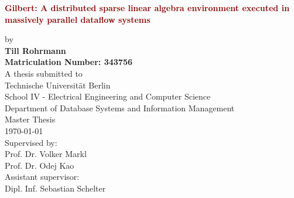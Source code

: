 \begin{titlepage}
	\strut
	\hfill
	\begin{center}
	\vspace{1cm}
	\Huge
	\begin{spacing}{.9}
		\textcolor{DarkRed}{\textbf{Gilbert: A distributed sparse linear algebra environment executed in massively parallel dataflow systems}}\\
	\end{spacing}
	\vspace{0.8cm}
	\large
	by\\
	\vspace{0.8cm} 
	\textbf{Till Rohrmann}\\
	\vspace{0.8cm} 
	\textbf{Matriculation Number: 343756}\\
	\vspace{2cm} 
 	A thesis submitted to\\
	\vspace{0.5cm}
	Technische Universität Berlin\\
	School IV - Electrical Engineering and Computer Science\\
	Department of Database Systems and Information Management\\
	\vspace{0.5cm}
	Master Thesis\\
	\vspace{2.2cm}
	\today\\
	\vspace{2.0cm}
	\large
	Supervised by:\\
	Prof. Dr. Volker Markl\\
	Prof. Dr. Odej Kao\\
	\vspace{1cm}
	Assistant supervisor:\\
	Dipl. Inf. Sebastian Schelter
	\end{center}
\end{titlepage}